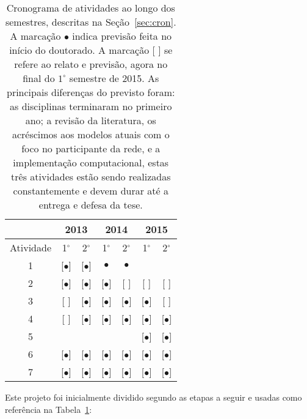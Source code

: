 \documentclass[a4paper,openright,12pt]{report} %
\begin{document}
\begin{table}[h]
\begin{center}
  \caption{ \footnotesize Cronograma de atividades ao longo dos semestres, descritas na Seção~\ref{sec:cron}.
      A marcação $\bullet$ indica previsão feita no início do doutorado.
  A marcação [ ] se refere ao relato e previsão, agora no final do $1^{\circ}$ semestre de 2015.
  As principais diferenças do previsto foram: as disciplinas terminaram no primeiro ano; a revisão da literatura, os acréscimos aos modelos atuais com o foco no participante da rede, e a implementação computacional, estas três atividades estão sendo realizadas constantemente e devem durar até a entrega e defesa da tese. }
\label{tab:cron}
  \begin{tabular}{ | c ||   c | c |     c | c |   c | c |}
    \hline
      & \multicolumn{2}{|c|}{2013} & \multicolumn{2}{|c|}{2014} & \multicolumn{2}{|c|}{2015} \\
    \hline
    Atividade & 1$^{\circ}$ & 2$^{\circ}$ & 1$^{\circ}$ & 2$^{\circ}$ & 1$^{\circ}$ & 2$^{\circ}$ \\
    \hline \hline

    1 & [$\bullet$] & [$\bullet$] & $\bullet$ & $\bullet$ & & \\
    \hline
    2 & [$\bullet$] & [$\bullet$] & [$\bullet$] & [ ] & [ ] & [ ] \\
    \hline
    3 & [ ] & [$\bullet$] & [$\bullet$] & [$\bullet$] & [$\bullet$] & [ ]  \\
    \hline
    4 & [ ] & [$\bullet$] & [$\bullet$] & [$\bullet$] & [$\bullet$] & [$\bullet$]  \\
    \hline
    5 & & & & & [$\bullet$] & [$\bullet$]  \\
    \hline
    6 & [$\bullet$] & [$\bullet$] & [$\bullet$] & [$\bullet$] & [$\bullet$] & [$\bullet$]  \\
    \hline
    7 & [$\bullet$] & [$\bullet$] & [$\bullet$] & [$\bullet$] & [$\bullet$] & [$\bullet$]  \\
    \hline
  \end{tabular}
\end{center}
\end{table}


Este projeto foi inicialmente dividido segundo as etapas a seguir 
e usadas como referência na Tabela~\ref{tab:cron}:
\end{document}
